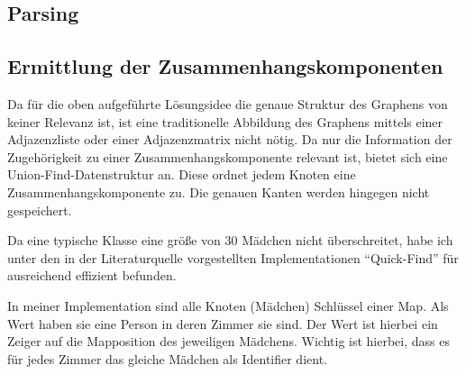 \subsection{Parsing}

\subsection{Ermittlung der Zusammenhangskomponenten}
Da für die oben aufgeführte Lösungsidee die genaue Struktur des Graphens von keiner Relevanz ist, ist eine traditionelle Abbildung des Graphens mittels einer Adjazenzliste oder einer Adjazenzmatrix nicht nötig.
Da nur die Information der Zugehörigkeit zu einer Zusammenhangskomponente relevant ist, bietet sich eine Union-Find-Datenstruktur\autocite[S. 238]{Sedgewick2014} an. Diese ordnet jedem Knoten eine Zusammenhangskomponente zu. Die genauen Kanten werden hingegen nicht gespeichert.

Da eine typische Klasse eine größe von 30 Mädchen nicht überschreitet, habe ich unter den in der Literaturquelle vorgestellten Implementationen "`Quick-Find"'\autocite[S. 245]{Sedgewick2014} für ausreichend effizient befunden.

In meiner Implementation sind alle Knoten (Mädchen) Schlüssel einer Map. Als Wert haben sie eine Person in deren Zimmer sie sind. Der Wert ist hierbei ein Zeiger auf die Mapposition des jeweiligen Mädchens. Wichtig ist hierbei, dass es für jedes Zimmer das gleiche Mädchen als Identifier dient.

